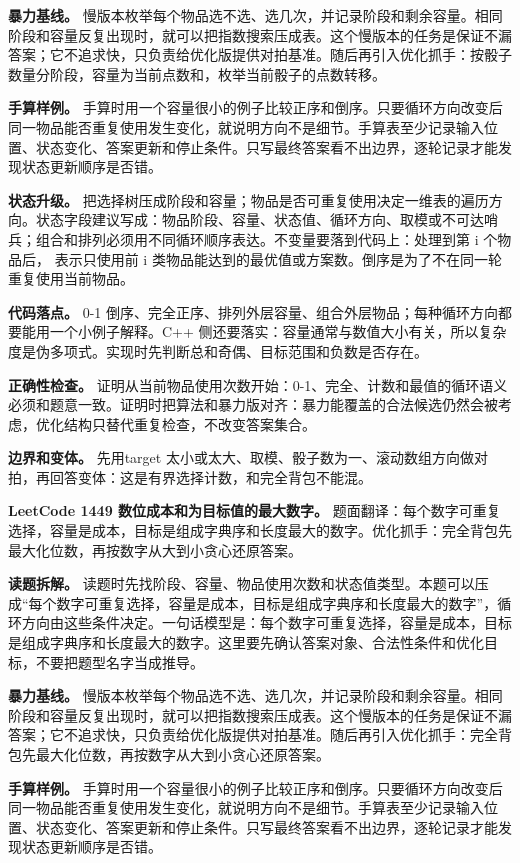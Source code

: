 \textbf{暴力基线。} 慢版本枚举每个物品选不选、选几次，并记录阶段和剩余容量。相同阶段和容量反复出现时，就可以把指数搜索压成表。这个慢版本的任务是保证不漏答案；它不追求快，只负责给优化版提供对拍基准。随后再引入优化抓手：按骰子数量分阶段，容量为当前点数和，枚举当前骰子的点数转移。

\textbf{手算样例。} 手算时用一个容量很小的例子比较正序和倒序。只要循环方向改变后同一物品能否重复使用发生变化，就说明方向不是细节。手算表至少记录输入位置、状态变化、答案更新和停止条件。只写最终答案看不出边界，逐轮记录才能发现状态更新顺序是否错。

\textbf{状态升级。} 把选择树压成阶段和容量；物品是否可重复使用决定一维表的遍历方向。状态字段建议写成：物品阶段、容量、状态值、循环方向、取模或不可达哨兵；组合和排列必须用不同循环顺序表达。不变量要落到代码上：处理到第 i 个物品后， 表示只使用前 i 类物品能达到的最优值或方案数。倒序是为了不在同一轮重复使用当前物品。

\textbf{代码落点。} 0-1 倒序、完全正序、排列外层容量、组合外层物品；每种循环方向都要能用一个小例子解释。C++ 侧还要落实：容量通常与数值大小有关，所以复杂度是伪多项式。实现时先判断总和奇偶、目标范围和负数是否存在。

\textbf{正确性检查。} 证明从当前物品使用次数开始：0-1、完全、计数和最值的循环语义必须和题意一致。证明时把算法和暴力版对齐：暴力能覆盖的合法候选仍然会被考虑，优化结构只替代重复检查，不改变答案集合。

\textbf{边界和变体。} 先用target 太小或太大、取模、骰子数为一、滚动数组方向做对拍，再回答变体：这是有界选择计数，和完全背包不能混。

\noindent\textbf{LeetCode 1449 数位成本和为目标值的最大数字。} 题面翻译：每个数字可重复选择，容量是成本，目标是组成字典序和长度最大的数字。优化抓手：完全背包先最大化位数，再按数字从大到小贪心还原答案。

\textbf{读题拆解。} 读题时先找阶段、容量、物品使用次数和状态值类型。本题可以压成“每个数字可重复选择，容量是成本，目标是组成字典序和长度最大的数字”，循环方向由这些条件决定。一句话模型是：每个数字可重复选择，容量是成本，目标是组成字典序和长度最大的数字。这里要先确认答案对象、合法性条件和优化目标，不要把题型名字当成推导。

\textbf{暴力基线。} 慢版本枚举每个物品选不选、选几次，并记录阶段和剩余容量。相同阶段和容量反复出现时，就可以把指数搜索压成表。这个慢版本的任务是保证不漏答案；它不追求快，只负责给优化版提供对拍基准。随后再引入优化抓手：完全背包先最大化位数，再按数字从大到小贪心还原答案。

\textbf{手算样例。} 手算时用一个容量很小的例子比较正序和倒序。只要循环方向改变后同一物品能否重复使用发生变化，就说明方向不是细节。手算表至少记录输入位置、状态变化、答案更新和停止条件。只写最终答案看不出边界，逐轮记录才能发现状态更新顺序是否错。

